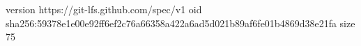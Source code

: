 version https://git-lfs.github.com/spec/v1
oid sha256:59378e1e00e92ff6ef2c76a66358a422a6ad5d021b89af6fe01b4869d38e21fa
size 75
